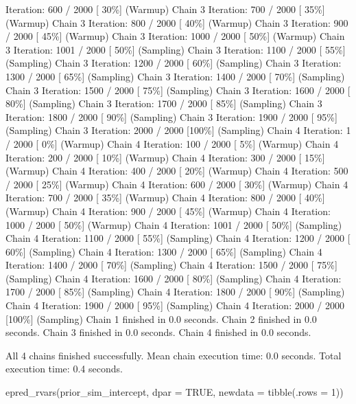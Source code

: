 \documentclass[
]{article}
\newenvironment{Shaded}{\begin{snugshade}}{\end{snugshade}}
\newcommand{\AttributeTok}[1]{\textcolor[rgb]{0.40,0.45,0.13}{#1}}
\newcommand{\ConstantTok}[1]{\textcolor[rgb]{0.56,0.35,0.01}{#1}}
\newcommand{\DecValTok}[1]{\textcolor[rgb]{0.68,0.00,0.00}{#1}}
\newcommand{\FunctionTok}[1]{\textcolor[rgb]{0.28,0.35,0.67}{#1}}
\newcommand{\NormalTok}[1]{\textcolor[rgb]{0.00,0.23,0.31}{#1}}
\begin{document}
Iteration: 600 / 2000 {[} 30\%{]} (Warmup) Chain 3 Iteration: 700 / 2000
{[} 35\%{]} (Warmup) Chain 3 Iteration: 800 / 2000 {[} 40\%{]} (Warmup)
Chain 3 Iteration: 900 / 2000 {[} 45\%{]} (Warmup) Chain 3 Iteration:
1000 / 2000 {[} 50\%{]} (Warmup) Chain 3 Iteration: 1001 / 2000 {[}
50\%{]} (Sampling) Chain 3 Iteration: 1100 / 2000 {[} 55\%{]} (Sampling)
Chain 3 Iteration: 1200 / 2000 {[} 60\%{]} (Sampling) Chain 3 Iteration:
1300 / 2000 {[} 65\%{]} (Sampling) Chain 3 Iteration: 1400 / 2000 {[}
70\%{]} (Sampling) Chain 3 Iteration: 1500 / 2000 {[} 75\%{]} (Sampling)
Chain 3 Iteration: 1600 / 2000 {[} 80\%{]} (Sampling) Chain 3 Iteration:
1700 / 2000 {[} 85\%{]} (Sampling) Chain 3 Iteration: 1800 / 2000 {[}
90\%{]} (Sampling) Chain 3 Iteration: 1900 / 2000 {[} 95\%{]} (Sampling)
Chain 3 Iteration: 2000 / 2000 {[}100\%{]} (Sampling) Chain 4 Iteration:
1 / 2000 {[} 0\%{]} (Warmup) Chain 4 Iteration: 100 / 2000 {[} 5\%{]}
(Warmup) Chain 4 Iteration: 200 / 2000 {[} 10\%{]} (Warmup) Chain 4
Iteration: 300 / 2000 {[} 15\%{]} (Warmup) Chain 4 Iteration: 400 / 2000
{[} 20\%{]} (Warmup) Chain 4 Iteration: 500 / 2000 {[} 25\%{]} (Warmup)
Chain 4 Iteration: 600 / 2000 {[} 30\%{]} (Warmup) Chain 4 Iteration:
700 / 2000 {[} 35\%{]} (Warmup) Chain 4 Iteration: 800 / 2000 {[}
40\%{]} (Warmup) Chain 4 Iteration: 900 / 2000 {[} 45\%{]} (Warmup)
Chain 4 Iteration: 1000 / 2000 {[} 50\%{]} (Warmup) Chain 4 Iteration:
1001 / 2000 {[} 50\%{]} (Sampling) Chain 4 Iteration: 1100 / 2000 {[}
55\%{]} (Sampling) Chain 4 Iteration: 1200 / 2000 {[} 60\%{]} (Sampling)
Chain 4 Iteration: 1300 / 2000 {[} 65\%{]} (Sampling) Chain 4 Iteration:
1400 / 2000 {[} 70\%{]} (Sampling) Chain 4 Iteration: 1500 / 2000 {[}
75\%{]} (Sampling) Chain 4 Iteration: 1600 / 2000 {[} 80\%{]} (Sampling)
Chain 4 Iteration: 1700 / 2000 {[} 85\%{]} (Sampling) Chain 4 Iteration:
1800 / 2000 {[} 90\%{]} (Sampling) Chain 4 Iteration: 1900 / 2000 {[}
95\%{]} (Sampling) Chain 4 Iteration: 2000 / 2000 {[}100\%{]} (Sampling)
Chain 1 finished in 0.0 seconds. Chain 2 finished in 0.0 seconds. Chain
3 finished in 0.0 seconds. Chain 4 finished in 0.0 seconds.

All 4 chains finished successfully. Mean chain execution time: 0.0
seconds. Total execution time: 0.4 seconds.

\begin{Shaded}
\begin{Highlighting}[]
\FunctionTok{epred\_rvars}\NormalTok{(prior\_sim\_intercept, }
            \AttributeTok{dpar =} \ConstantTok{TRUE}\NormalTok{, }
            \AttributeTok{newdata =} \FunctionTok{tibble}\NormalTok{(}\AttributeTok{.rows =} \DecValTok{1}\NormalTok{))}
\end{Highlighting}
\end{Shaded}
\end{document}
